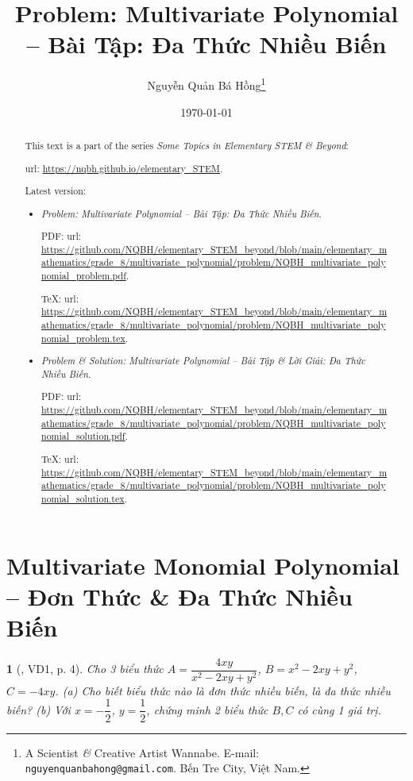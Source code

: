 \documentclass{article}
\title{Problem: Multivariate Polynomial -- Bài Tập: Đa Thức Nhiều Biến}
\author{Nguyễn Quản Bá Hồng\footnote{A Scientist {\it\&} Creative Artist Wannabe. E-mail: {\tt nguyenquanbahong@gmail.com}. Bến Tre City, Việt Nam.}}
\date{\today}
\newtheorem{baitoan}{}
\begin{document}
\maketitle
\begin{abstract}
	This text is a part of the series {\it Some Topics in Elementary STEM \& Beyond}:
	
	{\sc url}: \url{https://nqbh.github.io/elementary_STEM}.
	
	Latest version:
	\begin{itemize}
		\item {\it Problem: Multivariate Polynomial -- Bài Tập: Đa Thức Nhiều Biến}.
		
		PDF: {\sc url}: \url{https://github.com/NQBH/elementary_STEM_beyond/blob/main/elementary_mathematics/grade_8/multivariate_polynomial/problem/NQBH_multivariate_polynomial_problem.pdf}.
		
		\TeX: {\sc url}: \url{https://github.com/NQBH/elementary_STEM_beyond/blob/main/elementary_mathematics/grade_8/multivariate_polynomial/problem/NQBH_multivariate_polynomial_problem.tex}.
		\item {\it Problem \& Solution: Multivariate Polynomial -- Bài Tập \& Lời Giải: Đa Thức Nhiều Biến}.
		
		PDF: {\sc url}: \url{https://github.com/NQBH/elementary_STEM_beyond/blob/main/elementary_mathematics/grade_8/multivariate_polynomial/problem/NQBH_multivariate_polynomial_solution.pdf}.
		
		\TeX: {\sc url}: \url{https://github.com/NQBH/elementary_STEM_beyond/blob/main/elementary_mathematics/grade_8/multivariate_polynomial/problem/NQBH_multivariate_polynomial_solution.tex}.
	\end{itemize}
\end{abstract}
\tableofcontents


\section{Multivariate Monomial Polynomial -- Đơn Thức \& Đa Thức Nhiều Biến}

\begin{baitoan}[\cite{Tuyen_Toan_8}, VD1, p. 4]
	Cho 3 biểu thức $A = \dfrac{4xy}{x^2 - 2xy + y^2}$, $B = x^2 - 2xy + y^2$, $C = -4xy$. (a) Cho biết biểu thức nào là đơn thức nhiều biến, là đa thức nhiều biến? (b) Với $x = -\dfrac{1}{2}$, $y = \dfrac{1}{2}$, chứng minh 2 biểu thức $B,C$ có cùng 1 giá trị.
\end{baitoan}
\end{document}
